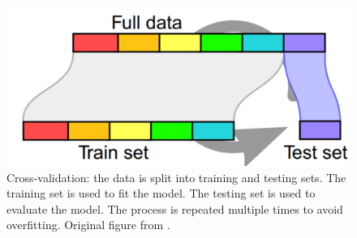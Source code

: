 \documentclass[french,12pt,twoside,a4paper]{book}
\begin{document}
\begin{figure}[!b]
  \centering
  \includegraphics[width=0.8\linewidth]{img/chapter_1/cross_validation.png}
  \caption{Cross-validation: the data is split into training and testing sets.
    The training set is used to fit the model. The testing set is used to
    evaluate the model. The process is repeated multiple times to avoid
    overfitting. Original figure from \cite{varoquaux2017assessing}.}
  \label{fig:intro:cross_validation}
\end{figure}
\end{document}
